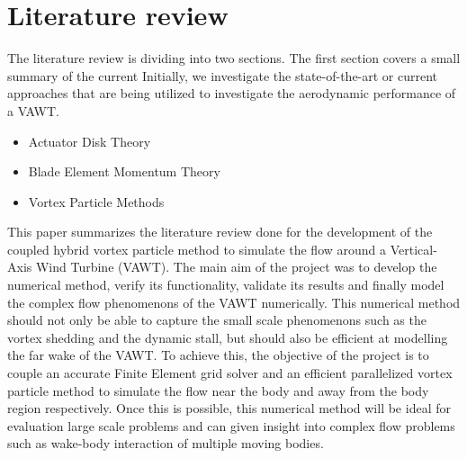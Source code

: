 %
%
%
%
%
%
%
%
%

\chapter{Literature review}
\label{sec:intro}

The literature review is dividing into two sections. The first section covers a small summary of the current Initially, we investigate the state-of-the-art or current approaches that are being utilized to investigate the aerodynamic performance of a VAWT.

\begin{itemize}
\item Actuator Disk Theory
\item Blade Element Momentum Theory
\item Vortex Particle Methods
\end{itemize}

This paper summarizes the literature review done for the development of the coupled hybrid vortex particle method to simulate the flow around a Vertical-Axis Wind Turbine (VAWT). The main aim of the project was to develop the numerical method, verify its functionality, validate its results and finally model the complex flow phenomenons of the VAWT numerically. This numerical method should not only be able to capture the small scale phenomenons such as the vortex shedding and the dynamic stall, but should also be efficient at modelling the far wake of the VAWT. To achieve this, the objective of the project is to couple an accurate Finite Element grid solver and an efficient parallelized vortex particle method to simulate the flow near the body and away from the body region respectively. Once this is possible, this numerical method will be ideal for evaluation large scale problems and can given insight into complex flow problems such as wake-body interaction of multiple moving bodies.


